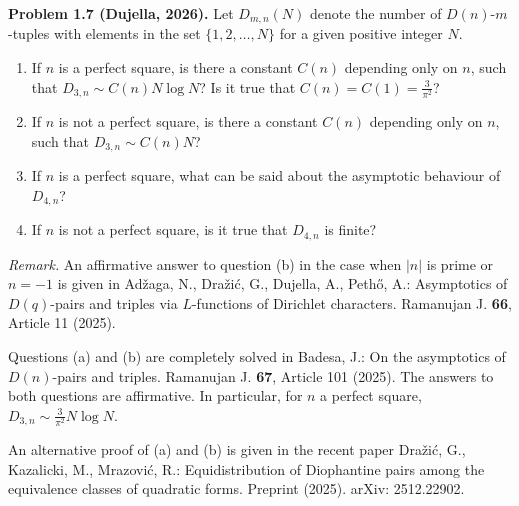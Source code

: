 \textbf{Problem 1.7 (Dujella, 2026).} Let $D_{m,n}(N)$ denote the number of $D(n)$-$m$-tuples with elements in the set $\{1,2,\ldots,N\}$ for a given positive integer $N$.
\begin{enumerate}
\item[(a)] If $n$ is a perfect square, is there a constant $C(n)$ depending only on $n$, such that $D_{3,n} \sim C(n)N \log N$? Is it true that $C(n) = C(1) = \frac{3}{\pi^2}$?
\item[(b)] If $n$ is not a perfect square, is there a constant $C(n)$ depending only on $n$, such that $D_{3,n} \sim C(n)N$?
\item[(c)] If $n$ is a perfect square, what can be said about the asymptotic behaviour of $D_{4,n}$?
\item[(d)] If $n$ is not a perfect square, is it true that $D_{4,n}$ is finite?
\end{enumerate}

\medskip

\textit{Remark.} An affirmative answer to question (b) in the case when $|n|$ is prime or $n = -1$ is given in Adžaga, N., Dražić, G., Dujella, A., Pethő, A.: Asymptotics of $D(q)$-pairs and triples via $L$-functions of Dirichlet characters. Ramanujan J. \textbf{66}, Article 11 (2025).

Questions (a) and (b) are completely solved in Badesa, J.: On the asymptotics of $D(n)$-pairs and triples. Ramanujan J. \textbf{67}, Article 101 (2025). The answers to both questions are affirmative. In particular, for $n$ a perfect square, $D_{3,n} \sim \frac{3}{\pi^2}N \log N$.

An alternative proof of (a) and (b) is given in the recent paper Dražić, G., Kazalicki, M., Mrazović, R.: Equidistribution of Diophantine pairs among the equivalence classes of quadratic forms. Preprint (2025). arXiv: 2512.22902.
